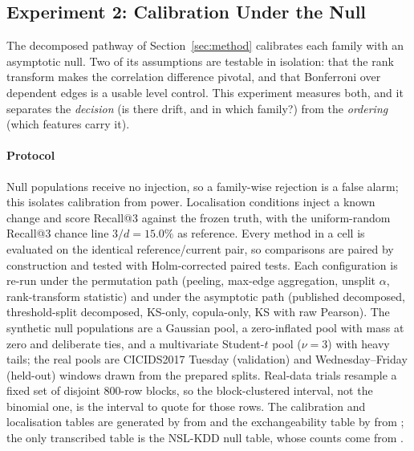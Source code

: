 
\subsection{Experiment 2: Calibration Under the Null}
\label{sec:calibration}

The decomposed pathway of Section~\ref{sec:method} calibrates each family with an
asymptotic null. Two of its assumptions are testable in isolation: that the rank
transform makes the correlation difference pivotal, and that Bonferroni over dependent
edges is a usable level control. This experiment measures both, and it separates the
\emph{decision} (is there drift, and in which family?) from the \emph{ordering} (which
features carry it).

\paragraph{Protocol}
Null populations receive no injection, so a family-wise rejection is a false alarm; this
isolates calibration from power. Localisation conditions inject a known change and score
Recall@3 against the frozen truth, with the uniform-random Recall@3 chance line
$3/d = 15.0\%$ as reference.
Every method in a cell is evaluated on the identical reference/current pair, so
comparisons are paired by construction and tested with Holm-corrected paired tests.
Each configuration is re-run under the permutation path (peeling, max-edge aggregation,
unsplit $\alpha$, rank-transform statistic) and under the asymptotic path (published
decomposed, threshold-split decomposed, KS-only, copula-only, KS with raw Pearson). The
synthetic null populations are a Gaussian pool, a zero-inflated pool with mass at zero and
deliberate ties, and a multivariate Student-$t$ pool ($\nu = 3$) with heavy tails; the
real pools are CICIDS2017 Tuesday (validation) and Wednesday--Friday (held-out) windows
drawn from the prepared splits. Real-data trials resample a fixed set of disjoint
$800$-row blocks, so the block-clustered interval, not the binomial one, is the interval
to quote for those rows. The calibration and localisation tables are generated by
 from
 and the exchangeability table by
 from
; the only transcribed table
is the NSL-KDD null table, whose counts come from
.

